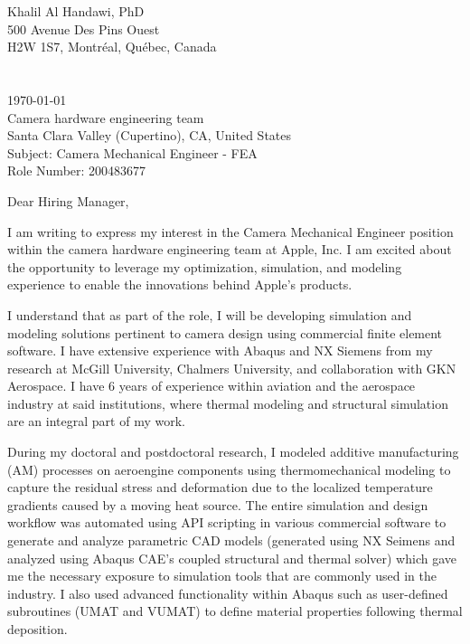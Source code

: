 \documentclass[12pt]{article} %
\begin{document}

Khalil Al Handawi, PhD\\
500 Avenue Des Pins Ouest\\
H2W 1S7, Montr\'{e}al, Qu\'{e}bec, Canada\\
\faPhone~~\cvnumberphone\\
\faEnvelope~~\href{mailto:\cvmail}{\cvmail}\\

\today\\

Camera hardware engineering team\\
Santa Clara Valley (Cupertino), CA, United States\\
Subject: Camera Mechanical Engineer - FEA\\
Role Number: 200483677\\[6pt] \medskip


Dear Hiring Manager,

\medskip %

I am writing to express my interest in the Camera Mechanical Engineer position within the camera hardware engineering team at Apple, Inc. I am excited about the opportunity to leverage my optimization, simulation, and modeling experience to enable the innovations behind Apple's products.

\medskip %

I understand that as part of the role, I will be developing simulation and modeling solutions pertinent to camera design using commercial finite element software. I have extensive experience with Abaqus and NX Siemens from my research at McGill University, Chalmers University, and collaboration with GKN Aerospace. I have 6 years of experience within aviation and the aerospace industry at said institutions, where thermal modeling and structural simulation are an integral part of my work.

\medskip %

During my doctoral and postdoctoral research, I modeled additive manufacturing (AM) processes on aeroengine components using thermomechanical modeling to capture the residual stress and deformation due to the localized temperature gradients caused by a moving heat source. The entire simulation and design workflow was automated using API scripting in various commercial software to generate and analyze parametric CAD models (generated using NX Seimens and analyzed using Abaqus CAE's coupled structural and thermal solver) which gave me the necessary exposure to simulation tools that are commonly used in the industry. I also used advanced functionality within Abaqus such as user-defined subroutines (UMAT and VUMAT) to define material properties following thermal deposition. 
\end{document}
